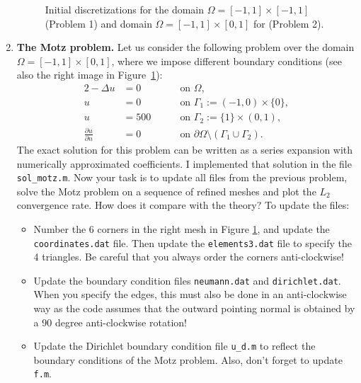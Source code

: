 \documentclass[11pt]{article}
\begin{document}
\begin{enumerate}
\begin{figure}[h!]
\begin{tikzpicture}
\end{tikzpicture}
\caption{Initial discretizations for the domain
  $\Omega=[-1,1]\times[-1,1]$ (Problem 1) and domain
  $\Omega=[-1,1]\times [0,1]$ for (Problem 2).\label{fig1}}
\end{figure}


\item {\bf The Motz problem.} Let us consider the following problem
  over the domain $\Omega=[-1,1]\times [0,1]$, where we impose
  different boundary conditions (see also the right image in
  Figure~\ref{fig1}):
  \begin{alignat}{2}
    -\Delta u  &= 0 \quad &&\text{ on } \Omega,\\
    u &= 0  \quad &&\text{ on } \Gamma_{\!1}:=(-1,0)\times\{0\}, \\
    u &= 500  \quad &&\text{ on } \Gamma_{\!2}:=\{1\}\times (0,1), \\
    \frac{\partial u}{\partial n} &= 0 \quad &&\text{ on }
    \partial\Omega\setminus(\Gamma_{\!1}\cup\Gamma_{\!2}).
  \end{alignat}
  The exact solution for this problem can be written as a series
  expansion with numerically approximated coefficients. I implemented
  that solution in the file \texttt{sol\_motz.m}. Now your task is to
  update all files from the previous problem, solve the Motz problem
  on a sequence of refined meshes and plot the $L_2$ convergence
  rate. How does it compare with the theory?  To update the files:
  \begin{itemize}
    \item Number the 6 corners in the right mesh in Figure \ref{fig1},
      and update the \texttt{coordinates.dat} file. Then update the
      \texttt{elements3.dat} file to specify the 4 triangles. Be
      careful that you always order the corners anti-clockwise!
    \item Update the boundary condition files \texttt{neumann.dat} and
      \texttt{dirichlet.dat}. When you specify the edges, this must
      also be done in an anti-clockwise way as the code assumes that
      the outward pointing normal is obtained by a 90 degree
      anti-clockwise rotation!
     \item Update the Dirichlet boundary condition file
       \texttt{u\_d.m} to reflect the boundary conditions of the Motz
       problem. Also, don't forget to update \texttt{f.m}.
  \end{itemize}



\end{enumerate}
\end{document}
